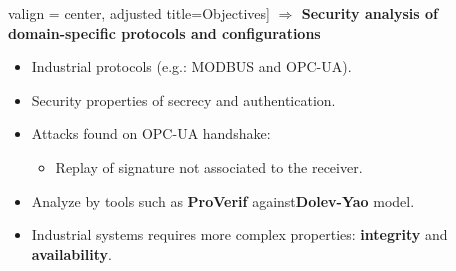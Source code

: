 \documentclass{beamer}
\newcommand{\proverif}{ProVerif\xspace}
\newcommand{\modbus}{MODBUS\xspace}
\newcommand{\opcua}{OPC-UA\xspace}
\newcommand{\eg}{e.g.:\xspace}
\begin{document}
\begin{frame}[fragile]{}
\begin{tcolorbox}[adjusted title={\centering\large Formal Analysis of Industrial Protocols}]
\begin{columns}[T]
\begin{column}{.35\textwidth}
\begin{tcolorbox}
                valign = center,
                adjusted title={\large Objectives}]
                    \vspace{.5em}
                    {\bf $\Rightarrow$ Security analysis of domain-specific protocols and configurations}
                    \begin{itemize}
                        \item Industrial protocols (\eg \modbus and \opcua).
                        \vspace{.5em}
                        \vspace{-1.3em}
                        \item Security properties of secrecy and authentication.
                        \vspace{.7em}
                        \item Attacks found on \opcua handshake:
                        \begin{itemize}
                            \item Replay of signature not associated to the receiver.
                        \end{itemize}
                        \vspace{.7em}
                        \item Analyze by tools such as {\bf \proverif} against{\bf Dolev-Yao} model.
                        \vspace{.7em}
                        \item Industrial systems requires more complex properties: {\bf integrity} and {\bf availability}.
                    \end{itemize}
                \end{tcolorbox}
            \end{column}
            \begin{column}{.65\textwidth}
                \begin{tcolorbox}[
                colback=white, %
                colframe=normalTitleBlockColor, %
                colframe=gray!20, %
                boxrule=1mm,
                coltext=black, %
                coltitle=black, %
                bottom=2mm,
                equal height group=B,
                valign = center,
                adjusted title={\large Approach}]
                    \begin{columns}[c]

\end{columns}
\end{tcolorbox}
\end{column}
\end{columns}
\end{tcolorbox}
\end{frame}
\end{document}
